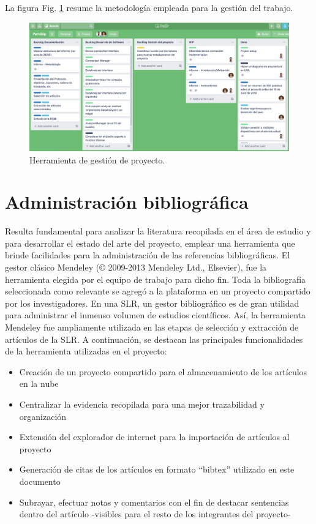 La figura Fig. \ref{fig:admin_project} resume la metodología empleada para la gestión del trabajo. 

\begin{figure}[H]
\includegraphics[width=\textwidth]{TESIS/imagenes/chap04/trello.png}
\caption{ Herramienta de gestión de proyecto. }
\label{fig:admin_project}
\end{figure}


\section{Administración bibliográfica}

Resulta fundamental para analizar la literatura recopilada en el área de estudio y para desarrollar el estado del arte del proyecto, emplear una herramienta que brinde facilidades para la administración de las referencias bibliográficas. El gestor clásico Mendeley (© 2009-2013 Mendeley Ltd., Elsevier), fue la herramienta elegida por el equipo de trabajo para dicho fin. Toda la bibliografía seleccionada como relevante se agregó a la plataforma en un proyecto compartido por los investigadores. 
En una SLR, un gestor bibliográfico es de gran utilidad para administrar el inmenso volumen de estudios científicos. Así, la herramienta Mendeley fue ampliamente utilizada en las etapas de selección y extracción de artículos de la SLR. A continuación, se destacan las principales funcionalidades de la herramienta utilizadas en el proyecto: 

\begin{itemize}
    \item Creación de un proyecto compartido para el almacenamiento de los artículos en la nube
    \item Centralizar la evidencia recopilada para una mejor trazabilidad y organización
    \item Extensión del explorador de internet para la importación de artículos al proyecto
    \item Generación de citas de los artículos en formato ``bibtex'' utilizado en este documento 
    \item Subrayar, efectuar notas y comentarios con el fin de destacar sentencias dentro del artículo -visibles para el resto de los integrantes del proyecto- 
\end{itemize}

